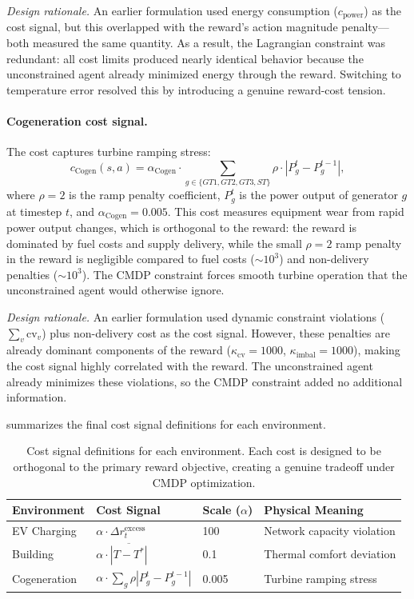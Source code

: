 \emph{Design rationale.} An earlier formulation used energy consumption ($c_{\text{power}}$) as the cost signal, but this overlapped with the reward's action magnitude penalty---both measured the same quantity. As a result, the Lagrangian constraint was redundant: all cost limits produced nearly identical behavior because the unconstrained agent already minimized energy through the reward. Switching to temperature error resolved this by introducing a genuine reward-cost tension.

\paragraph{Cogeneration cost signal.} The cost captures turbine ramping stress:
\begin{equation}
    c_{\text{Cogen}}(s, a) = \alpha_{\text{Cogen}} \cdot \sum_{g \in \{GT1, GT2, GT3, ST\}} \rho \cdot |P_g^t - P_g^{t-1}|,
    \label{eq:cogen_cost}
\end{equation}
where $\rho = 2$ is the ramp penalty coefficient, $P_g^t$ is the power output of generator $g$ at timestep $t$, and $\alpha_{\text{Cogen}} = 0.005$. This cost measures equipment wear from rapid power output changes, which is orthogonal to the reward: the reward is dominated by fuel costs and supply delivery, while the small $\rho = 2$ ramp penalty in the reward is negligible compared to fuel costs ($\sim\!10^3$) and non-delivery penalties ($\sim\!10^3$). The CMDP constraint forces smooth turbine operation that the unconstrained agent would otherwise ignore.

\emph{Design rationale.} An earlier formulation used dynamic constraint violations ($\sum_v \text{cv}_v$) plus non-delivery cost as the cost signal. However, these penalties are already dominant components of the reward ($\kappa_{\text{cv}} = 1000$, $\kappa_{\text{imbal}} = 1000$), making the cost signal highly correlated with the reward. The unconstrained agent already minimizes these violations, so the CMDP constraint added no additional information.

 summarizes the final cost signal definitions for each environment.

\begin{table}[htbp]
\centering
\caption{Cost signal definitions for each environment. Each cost is designed to be orthogonal to the primary reward objective, creating a genuine tradeoff under CMDP optimization.}
\label{tab:cost_signals}
\begin{tabular}{@{}llll@{}}
\toprule
\textbf{Environment} & \textbf{Cost Signal} & \textbf{Scale ($\alpha$)} & \textbf{Physical Meaning} \\
\midrule
EV Charging & $\alpha \cdot \Delta r_t^{\text{excess}}$ & 100 & Network capacity violation \\
Building & $\alpha \cdot \overline{|T - T^*|}$ & 0.1 & Thermal comfort deviation \\
Cogeneration & $\alpha \cdot \sum_g \rho |P_g^t - P_g^{t-1}|$ & 0.005 & Turbine ramping stress \\
\bottomrule
\end{tabular}
\end{table}

